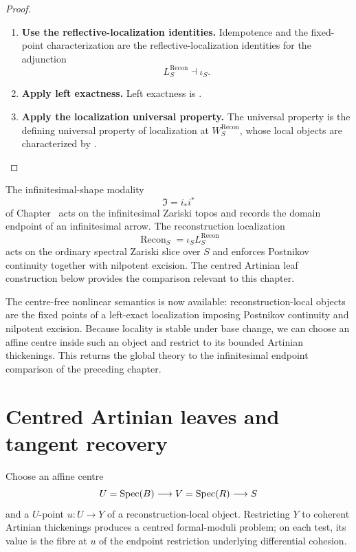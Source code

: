 \begin{proof}
\leavevmode
\begin{enumerate}[label=\textup{(\arabic*)}]
    \item \textbf{Use the reflective-localization identities.}
    Idempotence and the fixed-point characterization are the reflective-localization identities
    for the adjunction
    \[
        L^{\mathrm{Recon}}_S\dashv\iota_S.
    \]
    \item \textbf{Apply left exactness.}
    Left exactness is .
    \item \textbf{Apply the localization universal property.}
    The universal
    property is the defining universal property of localization at
    \(W^{\mathrm{Recon}}_S\), whose local objects are characterized by
    .
\end{enumerate}
\end{proof}

\begin{remark}
\label{rem:infinitesimal-shape-versus-formal-reconstruction}
The infinitesimal-shape modality
\[
    \Im=i_*i^*
\]
of Chapter~ acts on the
infinitesimal Zariski topos and records the domain endpoint of an
infinitesimal arrow. The reconstruction localization
\[
    \operatorname{Recon}_S=\iota_SL^{\mathrm{Recon}}_S
\]
acts on the ordinary spectral Zariski slice over \(S\) and enforces
Postnikov continuity together with nilpotent excision. The centred Artinian
leaf construction below provides the comparison relevant to this chapter.
\end{remark}


The centre-free nonlinear semantics is now available: reconstruction-local objects are
the fixed points of a left-exact localization imposing Postnikov continuity and
nilpotent excision. Because locality is stable under base change, we can choose an
affine centre inside such an object and restrict to its bounded Artinian thickenings.
This returns the global theory to the infinitesimal endpoint comparison of the preceding
chapter.

\section{Centred Artinian leaves and tangent recovery}
\label{sec:centres-artinian-leaves}


Choose an affine centre
\[
    U=\operatorname{Spec}(B)\longrightarrow V=\operatorname{Spec}(R)\longrightarrow S
\]
and a \(U\)-point \(u:U\to Y\) of a reconstruction-local object. Restricting \(Y\) to
coherent Artinian thickenings produces a centred formal-moduli problem; on each test,
its value is the fibre at \(u\) of the endpoint restriction underlying differential
cohesion.

